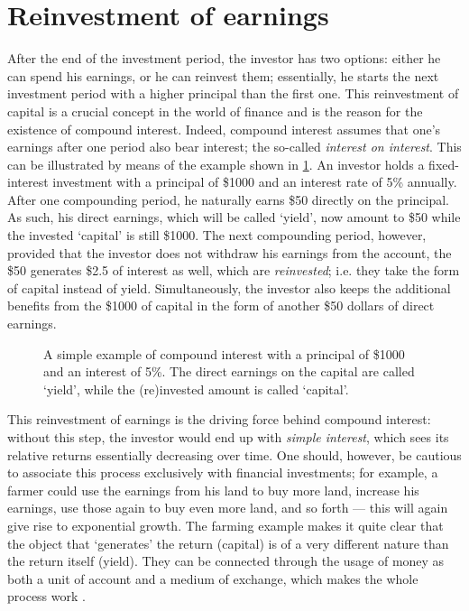 \section{Reinvestment of earnings}
After the end of the investment period, the investor has two options: either he can spend his earnings, or he can reinvest them; essentially, he starts the next investment period with a higher principal than the first one. This reinvestment of capital is a crucial concept in the world of finance and is the reason for the existence of compound interest. Indeed, compound interest assumes that one's earnings after one period also bear interest; the so-called \emph{interest on interest}. This can be illustrated by means of the example shown in \cref{fig:compound_interest}. An investor holds a fixed-interest investment with a principal of \$1000 and an interest rate of 5\% annually. After one compounding period, he naturally earns \$50 directly on the principal. As such, his direct earnings, which will be called `yield', now amount to \$50 while the invested `capital' is still \$1000. The next compounding period, however, provided that the investor does not withdraw his earnings from the account, the \$50 generates \$2.5 of interest as well, which are \emph{reinvested}; i.e. they take the form of capital instead of yield. Simultaneously, the investor also keeps the additional benefits from the \$1000 of capital in the form of another \$50 dollars of direct earnings.
\begin{figure}[h]
    \centering
    
    \caption{A simple example of compound interest with a principal of \$1000 and an interest of 5\%. The direct earnings on the capital are called `yield', while the (re)invested amount is called `capital'.}
    \label{fig:compound_interest}
\end{figure}
This reinvestment of earnings is the driving force behind compound interest: without this step, the investor would end up with \emph{simple interest}, which sees its relative returns essentially decreasing over time. One should, however, be cautious to associate this process exclusively with financial investments; for example, a farmer could use the earnings from his land to buy more land, increase his earnings, use those again to buy even more land, and so forth --- this will again give rise to exponential growth. The farming example makes it quite clear that the object that `generates' the return (capital) is of a very different nature than the return itself (yield). They can be connected through the usage of money as both a unit of account and a medium of exchange, which makes the whole process work \cite{Mankiw2017}. 

